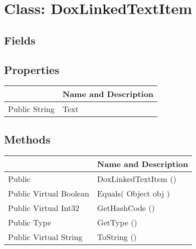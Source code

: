 \documentclass[11pt, oneside, a4paper]{book}
\begin{document}
\hypertarget{SoftwareEngineeringTools.{}Documentation.{}DoxLinkedTextItem}{}
\section{Class: DoxLinkedTextItem}

\subsection{Fields}

\subsection{Properties}
\begin{center}
\begin{tabular}{| p{3cm} | p{12cm} | }
\hline
\textbf{ } & \textbf{ Name and Description}\\
\hline
 Public  String &  Text\hypertarget{SoftwareEngineeringTools.{}Documentation.{}DoxLinkedTextItem.{}Text}{}\\
\hline
\end{tabular}
\end{center}

\subsection{Methods}
\begin{center}
\begin{tabular}{| p{3cm} | p{12cm} | }
\hline
\textbf{ } & \textbf{ Name and Description}\\
\hline
 Public  &  DoxLinkedTextItem ()\hypertarget{SoftwareEngineeringTools.{}Documentation.{}DoxLinkedTextItem.{}DoxLinkedTextItem}{}\\
\hline
 Public  Virtual  Boolean &  Equals(\hypertarget{SoftwareEngineeringTools.{}Documentation.{}DoxLinkedTextItem.{}Equals\_Object}{} Object  obj  )\\
\hline
 Public  Virtual  Int32 &  GetHashCode ()\hypertarget{SoftwareEngineeringTools.{}Documentation.{}DoxLinkedTextItem.{}GetHashCode}{}\\
\hline
 Public  Type &  GetType ()\hypertarget{SoftwareEngineeringTools.{}Documentation.{}DoxLinkedTextItem.{}GetType}{}\\
\hline
 Public  Virtual  String &  ToString ()\hypertarget{SoftwareEngineeringTools.{}Documentation.{}DoxLinkedTextItem.{}ToString}{}\\
\hline
\end{tabular}
\end{center}
 
\end{document}
